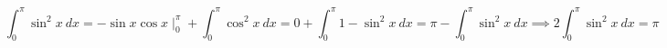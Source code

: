 



\[
	\int_{0}^{\pi} \sin^2 x\ dx
	= -\sin x \cos x \mid_0^\pi + \int_{0}^{\pi} \cos^2 x\ dx
	= 0 + \int_{0}^{\pi} 1 - \sin^2 x\ dx
	= \pi - \int_{0}^{\pi} \sin^2 x\ dx
	\implies
	2 \int_{0}^{\pi} \sin^2 x\ dx = \pi
\]


